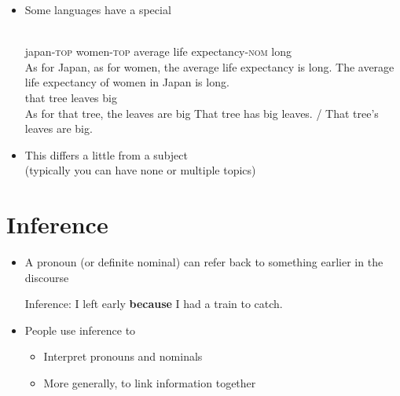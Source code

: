 \documentclass[headrule,footrule]{foils}
\begin{document}
\begin{itemize}
\item Some languages have a special 
  \begin{exe} %
    \ex \gll {}     \\
    japan-\textsc{top} women-\textsc{top} {average} {life expectancy}-\textsc{nom}
    long \\
    \trans As for Japan, as for women, the average life expectancy is long.
    \trans The average life expectancy of women in Japan is long.
    \ex \gll {}   {}   \\
    that tree {} leaves big \\
    \trans As for that tree, the leaves are big
    \trans That tree has big leaves. / That tree's leaves are big.
  \end{exe}
\item This differs a little from a subject 
  \\ (typically you can have none or multiple topics)
\end{itemize}

\section{Inference}

\begin{itemize}
\item A pronoun (or definite nominal) can refer back to something
  earlier in the discourse
  \begin{exe}
    \ex 
    \begin{xlist}
    \ex {}
    \ex {}
    \ex {}
    \ex {} \hfill {}
    \ex {} 
  \end{xlist}
  \ex 
 \begin{xlist}
   \ex {}
   \trans \textnormal{Inference: I left early \textbf{because} I had a train to catch.}
 \end{xlist}
\end{exe}
\item People use inference to 
  \begin{itemize}
  \item Interpret pronouns and nominals
  \item More generally, to link information together
  \end{itemize}
\end{itemize}
 
\end{document}
